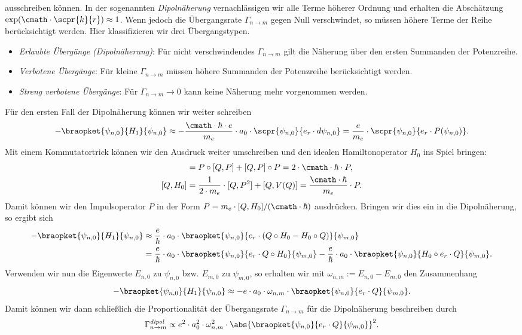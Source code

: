 \documentclass{subfile}
\begin{document}
        ausschreiben können. In der sogenannten \emph{Dipolnäherung} vernachlässigen wir alle Terme höherer Ordnung und erhalten die Abschätzung $\exp(\cmath\cdot\scpr{k}{r})\approx 1$. Wenn jedoch die Übergangsrate $\Gamma_{n\to m}$ gegen Null verschwindet, so müssen höhere Terme der Reihe berücksichtigt werden. Hier klassifizieren wir drei Übergangstypen.
        \begin{itemize}[label=$\to$]
            \item \emph{Erlaubte Übergänge (Dipolnäherung)}: Für nicht verschwindendes $\Gamma_{n\to m}$ gilt die Näherung über den ersten Summanden der Potenzreihe.
            \item \emph{Verbotene Übergänge}: Für kleine $\Gamma_{n\to m}$ müssen höhere Summanden der Potenzreihe berücksichtigt werden.
            \item \emph{Streng verbotene Übergänge}: Für $\Gamma_{n\to m} \to 0$ kann keine Näherung mehr vorgenommen werden. 
        \end{itemize}
        Für den ersten Fall der Dipolnäherung können wir weiter schreiben
        \[
            -\braopket{\psi_{n,0}}{H_1}{\psi_{n,0}} \approx -\frac{\cmath\cdot\hbar\cdot e}{m_e}\cdot a_0\cdot\scpr{\psi_{n,0}}{e_r\cdot d\psi_{n,0}} = \frac{e}{m_e}\cdot\scpr{\psi_{n,0}}{e_r\cdot P(\psi_{n,0})}.
        \]
        Mit einem Kommutatortrick können wir den Ausdruck weiter umschreiben und den idealen Hamiltonoperator $H_0$ ins Spiel bringen:
        \begin{align*}
            [Q,P^2] &= P\circ[Q,P] + [Q,P]\circ P = 2\cdot\cmath\cdot\hbar\cdot P, \\
            [Q,H_0] &= \frac{1}{2\cdot m_e}\cdot [Q,P^2] + [Q,V(Q)] = \frac{\cmath\cdot\hbar}{m_e}\cdot P.
        \end{align*}
        Damit können wir den Impulsoperator $P$ in der Form $P = m_e\cdot[Q,H_0]/(\cmath\cdot\hbar)$ ausdrücken. Bringen wir dies ein in die Dipolnäherung, so ergibt sich
        \begin{align*}
            -\braopket{\psi_{n,0}}{H_1}{\psi_{n,0}} &\approx \frac{e}{\hbar}\cdot a_0\cdot\braopket{\psi_{n,0}}{e_r\cdot (Q\circ H_0 - H_0\circ Q)}{\psi_{m,0}} \\ 
            &= \frac{e}{\hbar}\cdot a_0\cdot\braopket{\psi_{n,0}}{e_r\cdot Q\circ H_0}{\psi_{m,0}} - \frac{e}{\hbar}\cdot a_0\cdot\braopket{\psi_{n,0}}{H_0\circ e_r\cdot Q}{\psi_{m,0}}.
        \end{align*}
        Verwenden wir nun die Eigenwerte $E_{n,0}$ zu $\psi_{n,0}$ bzw. $E_{m,0}$ zu $\psi_{m,0}$, so erhalten wir mit $\omega_{n,m}:=E_{n,0} - E_{m,0}$ den Zusammenhang
        \[
            -\braopket{\psi_{n,0}}{H_1}{\psi_{n,0}} \approx -e\cdot a_0\cdot\omega_{n,m}\cdot\braopket{\psi_{n,0}}{e_r\cdot Q}{\psi_{m,0}}.
        \]
        Damit können wir dann schließlich die Proportionalität der Übergangsrate $\Gamma_{n\to m}$ für die Dipolnäherung beschreiben durch
        \[
            \Gamma_{n\to m}^\textit{dipol} \propto e^2\cdot a_0^2\cdot\omega_{n,m}^2\cdot\abs{\braopket{\psi_{n,0}}{e_r\cdot Q}{\psi_{m,0}}}^2.
        \]
        
\end{document}
